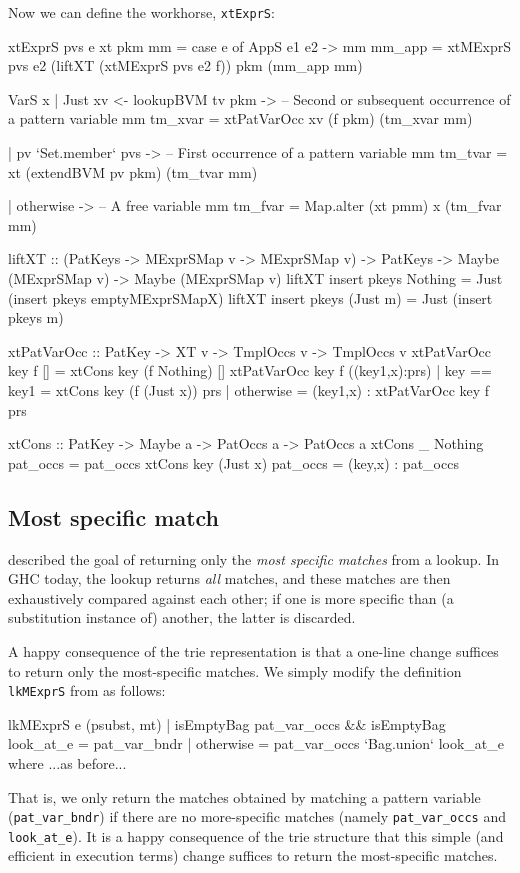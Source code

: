 \documentclass[acmsmall]{acmart}
\theoremstyle{theorem}
\theoremstyle{definition}
\theoremstyle{remark}
\begin{document}
Now we can define the workhorse, \lstinline{xtExprS}:
\begin{code}
xtExprS pvs e xt pkm mm
  = case e of
      AppS e1 e2 -> mm { mm_app = xtMExprS pvs e2 (liftXT (xtMExprS pvs e2 f))
                                           pkm (mm_app mm) }

      VarS x | Just xv <- lookupBVM tv pkm
             -> -- Second or subsequent occurrence of a pattern variable
                mm { tm_xvar = xtPatVarOcc xv (f pkm) (tm_xvar mm) }

             | pv `Set.member` pvs
             -> -- First occurrence of a pattern variable
                mm { tm_tvar = xt (extendBVM pv pkm) (tm_tvar mm) }

             | otherwise
             -> -- A free variable
                mm { tm_fvar = Map.alter (xt pmm) x (tm_fvar mm) }

liftXT :: (PatKeys -> MExprSMap v -> MExprSMap v)
        -> PatKeys -> Maybe (MExprSMap v) -> Maybe (MExprSMap v)
liftXT insert pkeys Nothing  = Just (insert pkeys emptyMExprSMapX)
liftXT insert pkeys (Just m) = Just (insert pkeys m)

xtPatVarOcc :: PatKey -> XT v -> TmplOccs v -> TmplOccs v
xtPatVarOcc key f []
  = xtCons key (f Nothing) []
xtPatVarOcc key f ((key1,x):prs)
  | key == key1 = xtCons key (f (Just x)) prs
  | otherwise   = (key1,x) : xtPatVarOcc key f prs

xtCons :: PatKey -> Maybe a -> PatOccs a -> PatOccs a
xtCons _   Nothing  pat_occs = pat_occs
xtCons key (Just x) pat_occs = (key,x) : pat_occs
\end{code}

\subsection{Most specific match}

 described the goal of returning only the \emph{most specific matches} from
a lookup.  In GHC today, the lookup returns \emph{all} matches, and these matches are then
exhaustively compared against each other; if one is more specific than (a substitution instance of) another, the latter is discarded.

A happy consequence of the trie representation is that a one-line change suffices
to return only the most-specific matches.  We simply modify the definition \lstinline{lkMExprS} from  as follows:
\begin{code}
lkMExprS e (psubst, mt)
  | isEmptyBag pat_var_occs && isEmptyBag look_at_e
  = pat_var_bndr
  | otherwise
  = pat_var_occs `Bag.union` look_at_e
  where
    ...as before...
\end{code}
That is, we only return the matches obtained by matching a pattern variable (\lstinline{pat_var_bndr}) if there
are no more-specific matches (namely \lstinline{pat_var_occs} and \lstinline{look_at_e}).  It is a happy
consequence of the trie structure that this simple (and efficient in execution terms) change suffices
to return the most-specific matches.
\end{document}
